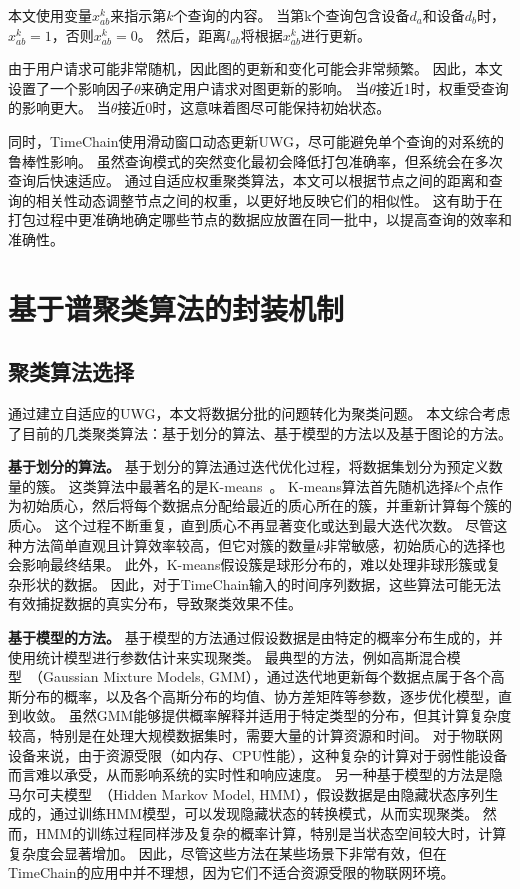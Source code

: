 本文使用变量$x_{ab}^k$来指示第$k$个查询的内容。
当第k个查询包含设备$d_a$和设备$d_b$时，$x_{ab}^k=1$，否则$x_{ab}^k=0$。
然后，距离$l_{ab}$将根据$x_{ab}^k$进行更新。

由于用户请求可能非常随机，因此图的更新和变化可能会非常频繁。
因此，本文设置了一个影响因子$\theta$来确定用户请求对图更新的影响。
当$\theta$接近1时，权重受查询的影响更大。
当$\theta$接近0时，这意味着图尽可能保持初始状态。

同时，TimeChain使用滑动窗口动态更新UWG，尽可能避免单个查询的对系统的鲁棒性影响。
虽然查询模式的突然变化最初会降低打包准确率，但系统会在多次查询后快速适应。
通过自适应权重聚类算法，本文可以根据节点之间的距离和查询的相关性动态调整节点之间的权重，以更好地反映它们的相似性。
这有助于在打包过程中更准确地确定哪些节点的数据应放置在同一批中，以提高查询的效率和准确性。

\section{基于谱聚类算法的封装机制}
\label{sec:ratiocut}

\subsection{聚类算法选择}
通过建立自适应的UWG，本文将数据分批的问题转化为聚类问题。
本文综合考虑了目前的几类聚类算法：基于划分的算法、基于模型的方法以及基于图论的方法。

\textbf{基于划分的算法。}
基于划分的算法通过迭代优化过程，将数据集划分为预定义数量的簇。
这类算法中最著名的是K-means~\cite{kanungo2002efficient}。
K-means算法首先随机选择$k$个点作为初始质心，然后将每个数据点分配给最近的质心所在的簇，并重新计算每个簇的质心。
这个过程不断重复，直到质心不再显著变化或达到最大迭代次数。
尽管这种方法简单直观且计算效率较高，但它对簇的数量$k$非常敏感，初始质心的选择也会影响最终结果。
此外，K-means假设簇是球形分布的，难以处理非球形簇或复杂形状的数据。
因此，对于TimeChain输入的时间序列数据，这些算法可能无法有效捕捉数据的真实分布，导致聚类效果不佳。

\textbf{基于模型的方法。}
基于模型的方法通过假设数据是由特定的概率分布生成的，并使用统计模型进行参数估计来实现聚类。
最典型的方法，例如高斯混合模型~\cite{kanungo2002efficient}（Gaussian Mixture Models, GMM），通过迭代地更新每个数据点属于各个高斯分布的概率，以及各个高斯分布的均值、协方差矩阵等参数，逐步优化模型，直到收敛。
虽然GMM能够提供概率解释并适用于特定类型的分布，但其计算复杂度较高，特别是在处理大规模数据集时，需要大量的计算资源和时间。
对于物联网设备来说，由于资源受限（如内存、CPU性能），这种复杂的计算对于弱性能设备而言难以承受，从而影响系统的实时性和响应速度。
另一种基于模型的方法是隐马尔可夫模型~\cite{he2010laplacian}（Hidden Markov Model, HMM），假设数据是由隐藏状态序列生成的，通过训练HMM模型，可以发现隐藏状态的转换模式，从而实现聚类。
然而，HMM的训练过程同样涉及复杂的概率计算，特别是当状态空间较大时，计算复杂度会显著增加。
因此，尽管这些方法在某些场景下非常有效，但在TimeChain的应用中并不理想，因为它们不适合资源受限的物联网环境。

